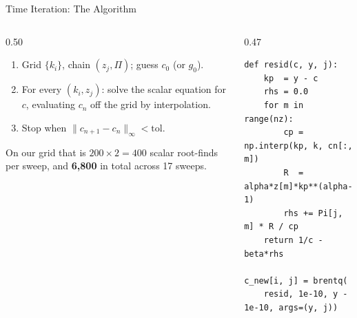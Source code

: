 \begin{frame}[fragile]{Time Iteration: The Algorithm}
\begin{columns}[T]
\begin{column}{0.50\textwidth}
\small
\begin{enumerate}\footnotesize
  \item Grid $\{k_i\}$, chain $(z_j,\Pi)$; guess $c_0$ (or $g_0$).
  \item For every $(k_i,z_j)$: solve the scalar equation for $c$, evaluating $c_n$ off the grid by interpolation.
  \item Stop when $\lVert c_{n+1}-c_n\rVert_\infty<\text{tol}$.
\end{enumerate}
\medskip
\footnotesize
On our grid that is $200\times2=400$ scalar root-finds per sweep, and \textbf{6{,}800} in total across 17 sweeps.
\end{column}
\begin{column}{0.47\textwidth}
\begin{lstlisting}
def resid(c, y, j):
    kp  = y - c
    rhs = 0.0
    for m in range(nz):
        cp = np.interp(kp, k, cn[:, m])
        R  = alpha*z[m]*kp**(alpha-1)
        rhs += Pi[j, m] * R / cp
    return 1/c - beta*rhs

c_new[i, j] = brentq(
    resid, 1e-10, y - 1e-10, args=(y, j))
\end{lstlisting}
\end{column}
\end{columns}
\vspace{1mm}
\end{frame}

